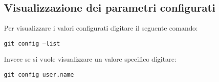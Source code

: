 \subsection{Visualizzazione dei parametri configurati}
Per visualizzare i valori configurati digitare il seguente comando:

\begin{center}
\texttt{git config --list}
\end{center}

Invece se si vuole visualizzare un valore specifico digitare:

\begin{center}
\texttt{git config user.name}
\end{center}